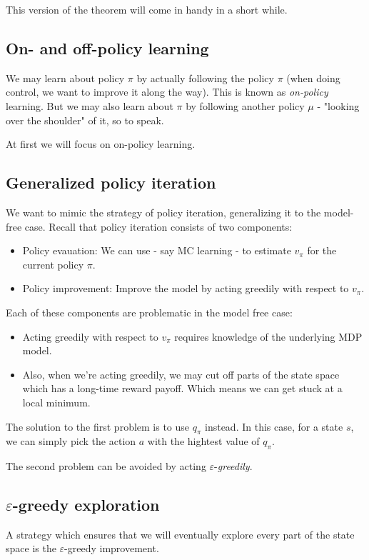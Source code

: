 \documentclass[12pt, a4paper]{article}
\numberwithin{equation}{section}
\begin{document}
This version of the theorem will come in handy in a short while.

\subsection{On- and off-policy learning}
We may learn about policy $\pi$ by actually following the policy $\pi$ (when doing control, we want to improve it along the way). This is known as \textit{on-policy} learning. But we may also learn about $\pi$ by following another policy $\mu$ - "looking over the shoulder" of it, so to speak.

At first we will focus on on-policy learning.

\subsection{Generalized policy iteration}
We want to mimic the strategy of policy iteration, generalizing it to the model-free case. Recall that policy iteration consists of two components:
\begin{itemize}
\item Policy evauation: We can use - say MC learning - to estimate $v_\pi$ for the current policy $\pi$.
\item Policy improvement: Improve the model by acting greedily with respect to $v_\pi$.
\end{itemize}
Each of these components are problematic in the model free case:
\begin{itemize}
\item Acting greedily with respect to $v_\pi$ requires knowledge of the underlying MDP model.
\item Also, when we're acting greedily, we may cut off parts of the state space which has a long-time reward payoff. Which means we can get stuck at a local minimum.
\end{itemize}
The solution to the first problem is to use $q_\pi$ instead. In this case, for a state $s$, we can simply pick the action $a$ with the hightest value of $q_\pi$.

The second problem can be avoided by acting $\varepsilon$-\textit{greedily}.
 
\subsection{$\varepsilon$-greedy exploration}
A strategy which ensures that we will eventually explore every part of the state space is the $\varepsilon$-greedy improvement.
\end{document}

